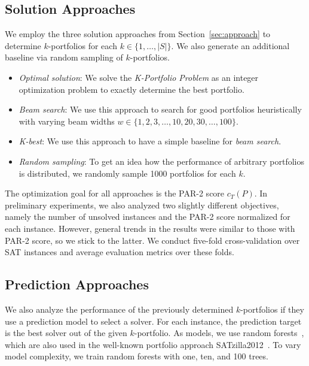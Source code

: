 \documentclass[conference]{IEEEtran}
\begin{document}
\subsection{Solution Approaches}

We employ the three solution approaches from Section~\ref{sec:approach} to determine $k$-portfolios for each $k \in \{1, \dots, |S|\}$. 
We also generate an additional baseline via random sampling of $k$-portfolios.

\begin{itemize}
	\item \emph{Optimal solution}:
	We solve the \emph{K-Portfolio Problem} as an integer optimization problem to exactly determine the best portfolio.
	\item \emph{Beam search}: 
	We use this approach to search for good portfolios heuristically with varying beam widths $w \in \{1, 2, 3, \dots, 10, 20, 30, \dots, 100\}$.
	\item \emph{K-best}:
	We use this approach to have a simple baseline for \emph{beam search}.
	\item \emph{Random sampling}:
	To get an idea how the performance of arbitrary portfolios is distributed, we randomly sample 1000 portfolios for each $k$.
\end{itemize}

The optimization goal for all approaches is the PAR-2 score $c_T(P)$.
In preliminary experiments, we also analyzed two slightly different objectives, namely the number of unsolved instances and the PAR-2 score normalized for each instance.
However, general trends in the results were similar to those with PAR-2 score, so we stick to the latter.
We conduct five-fold cross-validation over SAT instances and average evaluation metrics over these folds. 

\subsection{Prediction Approaches}

We also analyze the performance of the previously determined $k$-portfolios if they use a prediction model to select a solver. 
For each instance, the prediction target is the best solver out of the given $k$-portfolio.
As models, we use random forests~\cite{breiman2001random}, which are also used in the well-known portfolio approach SATzilla2012~\cite{xu2012satzilla2012}. 
To vary model complexity, we train random forests with one, ten, and 100 trees.
\end{document}
